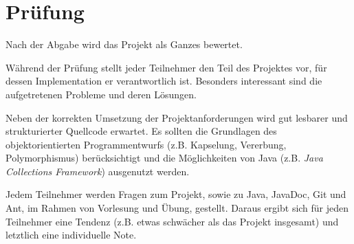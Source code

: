\section*{Prüfung}
Nach der Abgabe wird das Projekt als Ganzes bewertet.

Während der Prüfung stellt jeder Teilnehmer den Teil des Projektes vor, für dessen Implementation er verantwortlich ist. Besonders interessant sind die aufgetretenen Probleme und deren Lösungen.

Neben der korrekten Umsetzung der Projektanforderungen wird gut lesbarer und strukturierter Quellcode erwartet. Es sollten die Grundlagen des objektorientierten Programmentwurfs (z.B. Kapselung, Vererbung, Polymorphismus) berücksichtigt und die Möglichkeiten von Java (z.B. \emph{Java Collections Framework}) ausgenutzt werden.

Jedem Teilnehmer werden Fragen zum Projekt, sowie zu Java, JavaDoc, Git und Ant, im Rahmen von Vorlesung und Übung, gestellt. Daraus ergibt sich für jeden Teilnehmer eine Tendenz (z.B. etwas schwächer als das Projekt insgesamt) und letztlich eine individuelle Note.